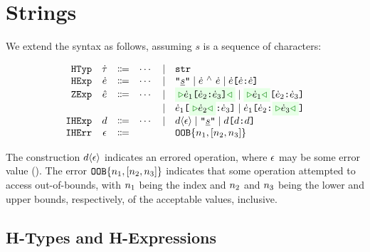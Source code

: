 \documentclass[12pt]{article}
\begin{document}
\section{Strings}

We extend the syntax as follows, assuming $s$ is a sequence of characters:
%
\begin{center}
  \vspace*{-1.5em}
  \[\begin{array}{rccccl}
    \HTyp     & \HTypVar     & \Coloneqq & \cdots & \mid & \HTypStr                                                  \\
    \HExp     & \HExpVar     & \Coloneqq & \cdots & \mid & \HExpStrLit 
                                               \mid   \HExpStrConcat{\HExpVar}{\HExpVar}
                                               \mid   \HExpStrSub{\HExpVar}{\HExpVar}{\HExpVar} \\
    \ZExp     & \ZExpVar     & \Coloneqq & \cdots & \mid & \ZExpStrSub{\HExpVar_1}{\HExpVar_2}{\HExpVar_3} 
                                               \mid   \ZExpStrSubI{\HExpVar_1}{\HExpVar_2}{\HExpVar_3} \\
              &              &           &   & \mid & \ZExpStrSubII{\HExpVar_1}{\HExpVar_2}{\HExpVar_3}
                                               \mid   \ZExpStrSubIII{\HExpVar_1}{\HExpVar_2}{\HExpVar_3} \\
    \IHExp    & \IHExpVar    & \Coloneqq & \cdots & \mid & \IHExpCastExceptVar{\IHExpVar}
                                               \mid   \IHExpStrLit 
                                               \mid   \IHExpStrSub{\IHExpVar}{\IHExpVar}{\IHExpVar} \\
    \IHExcept & \IHExceptVar & \Coloneqq &   &   & \IHExceptOOB{\IHExpNumLitVS{1}}{\IHExpNumLitVS{2}}{\IHExpNumLitVS{3}}
  \end{array}\]
\end{center}
%
The \IHExp{} construction $d \langle \epsilon \rangle$ indicates an errored operation, where
$\epsilon$ may be some error value (\IHExcept{}).
%
The error $\texttt{OOB}\{n_1, [n_2, n_3]\}$ indicates that
some operation attempted to access out-of-bounds, with $n_1$ being the index and
$n_2$ and $n_3$ being the lower and upper bounds, respectively, of the
acceptable values, inclusive.
\subsection{H-Types and H-Expressions}
\end{document}

